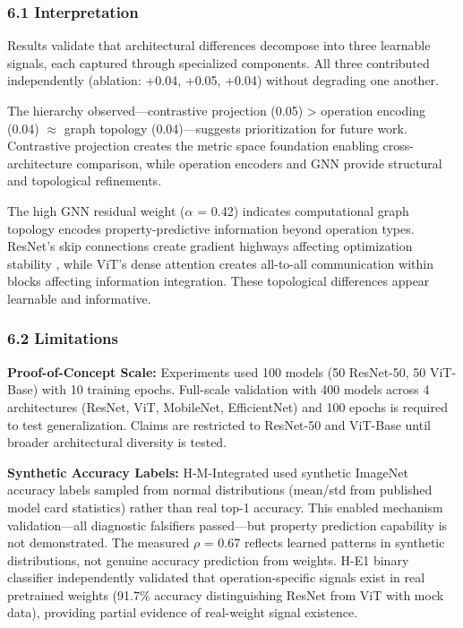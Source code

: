 
\subsubsection{6.1 Interpretation}

Results validate that architectural differences decompose into three learnable signals, each captured through specialized components. All three contributed independently (ablation: +0.04, +0.05, +0.04) without degrading one another.

The hierarchy observed---contrastive projection (0.05) > operation encoding (0.04) $\approx$ graph topology (0.04)---suggests prioritization for future work. Contrastive projection creates the metric space foundation enabling cross-architecture comparison, while operation encoders and GNN provide structural and topological refinements.

The high GNN residual weight ($\alpha$ = 0.42) indicates computational graph topology encodes property-predictive information beyond operation types. ResNet's skip connections create gradient highways affecting optimization stability \citep{He2016}, while ViT's dense attention creates all-to-all communication within blocks affecting information integration. These topological differences appear learnable and informative.

\subsubsection{6.2 Limitations}

\textbf{Proof-of-Concept Scale:} Experiments used 100 models (50 ResNet-50, 50 ViT-Base) with 10 training epochs. Full-scale validation with 400 models across 4 architectures (ResNet, ViT, MobileNet, EfficientNet) and 100 epochs is required to test generalization. Claims are restricted to ResNet-50 and ViT-Base until broader architectural diversity is tested.

\textbf{Synthetic Accuracy Labels:} H-M-Integrated used synthetic ImageNet accuracy labels sampled from normal distributions (mean/std from published model card statistics) rather than real top-1 accuracy. This enabled mechanism validation---all diagnostic falsifiers passed---but property prediction capability is not demonstrated. The measured $\rho$ = 0.67 reflects learned patterns in synthetic distributions, not genuine accuracy prediction from weights. H-E1 binary classifier independently validated that operation-specific signals exist in real pretrained weights (91.7\% accuracy distinguishing ResNet from ViT with mock data), providing partial evidence of real-weight signal existence.

